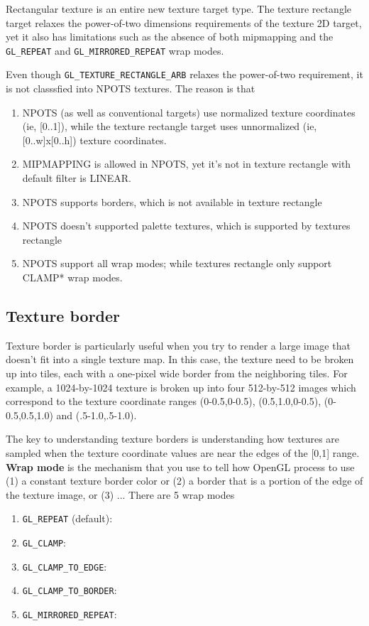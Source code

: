 Rectangular texture is an entire new texture target type.  The texture
rectangle target relaxes the power-of-two dimensions requirements of
the texture 2D target, yet it also has limitations such as the absence
of both mipmapping and the \verb!GL_REPEAT! and
\verb!GL_MIRRORED_REPEAT! wrap modes.  

Even though \verb!GL_TEXTURE_RECTANGLE_ARB! relaxes the power-of-two
requirement, it is not classsfied into NPOTS textures. The reason is
that
\begin{enumerate}
\item NPOTS (as well as conventional targets) use normalized texture
  coordinates (ie, [0..1]), while the texture rectangle target uses
  unnormalized (ie, [0..w]x[0..h]) texture coordinates.

\item MIPMAPPING is allowed in NPOTS, yet it's not in texture
  rectangle with default filter is LINEAR. 

\item NPOTS supports borders, which is not available in texture
  rectangle

\item NPOTS doesn't supported palette textures, which is supported by
  textures rectangle

\item NPOTS support all wrap modes; while textures rectangle only
  support CLAMP* wrap modes. 
\end{enumerate}

\subsection{Texture border}
\label{sec:texture-border}

Texture border is particularly useful when you try to render a large
image that doesn't fit into a single texture map. In this case, the
texture need to be broken up into tiles, each with a one-pixel wide
border from the neighboring tiles. For example, a 1024-by-1024 texture
is broken up into four 512-by-512 images which correspond to the
texture coordinate ranges (0-0.5,0-0.5), (0.5,1.0,0-0.5),
(0-0.5,0.5,1.0) and (.5-1.0,.5-1.0).

The key to understanding texture borders is understanding how textures
are sampled when the texture coordinate values are near the edges of
the [0,1] range. {\bf Wrap mode} is the mechanism that you use to tell
how OpenGL process to use (1) a constant texture border color or (2) a
border that is a portion of the edge of the texture image, or (3) ...
There are 5 wrap modes
\begin{enumerate}
\item \verb!GL_REPEAT! (default): 

\item \verb!GL_CLAMP!:

\item \verb!GL_CLAMP_TO_EDGE!: 

\item \verb!GL_CLAMP_TO_BORDER!:

\item \verb!GL_MIRRORED_REPEAT!: 
\end{enumerate}


